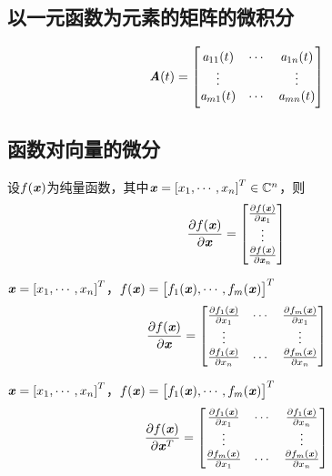 \subsection{以一元函数为元素的矩阵的微积分}
\label{sub:以一元函数为元素的矩阵的微积分}

\[
    \boldsymbol{\mathit{A}}(t) = \begin{bmatrix}
        \mathit{a}_{11}(t) & \cdots    & \mathit{a}_{1n}(t)   \\
        \vdots      &           & \vdots        \\
        \mathit{a}_{m1}(t) & \cdots    & \mathit{a}_{mn}(t)
    \end{bmatrix}
\]

\subsection{函数对向量的微分}
\label{sub:函数对向量的微分}

\begin{definition}
    设$f(\boldsymbol{\mathit{x}})$为纯量函数，其中$\boldsymbol{\mathit{x}} = \left[x_1, \cdots, x_n \right]^T \in \mathbb{C}^n$，则
    \[
        \frac{\partial f(\boldsymbol{\mathit{x}})}{\partial \boldsymbol{\mathit{x}}} = \begin{bmatrix}
            \frac{\partial f(\boldsymbol{\mathit{x}})}{\partial \boldsymbol{\mathit{x}}_1} \\
            \vdots \\
            \frac{\partial f(\boldsymbol{\mathit{x}})}{\partial \boldsymbol{\mathit{x}}_n}
        \end{bmatrix}
    \]
\end{definition}

\begin{definition}
    $\boldsymbol{\mathit{x}} = \left[x_1, \cdots, x_n \right]^T$，$f(\boldsymbol{\mathit{x}}) = \left[f_1(\boldsymbol{\mathit{x}}), \cdots, f_m(\boldsymbol{\mathit{x}}) \right]^T$
    \[
        \frac{\partial f(\boldsymbol{\mathit{x}})}{\partial \boldsymbol{\mathit{x}}} = \begin{bmatrix}
            \frac{\partial f_1(\boldsymbol{\mathit{x}})}{\partial x_1}  & \cdots & \frac{\partial f_m(\boldsymbol{\mathit{x}})}{\partial x_1} \\
            \vdots & & \vdots \\
            \frac{\partial f_1(\boldsymbol{\mathit{x}})}{\partial x_n}  & \cdots & \frac{\partial f_m(\boldsymbol{\mathit{x}})}{\partial x_n}
        \end{bmatrix}
    \]
\end{definition}

\begin{definition}[Jacobi矩阵]
    $\boldsymbol{\mathit{x}} = \left[x_1, \cdots, x_n \right]^T$，$f(\boldsymbol{\mathit{x}}) = \left[f_1(\boldsymbol{\mathit{x}}), \cdots, f_m(\boldsymbol{\mathit{x}}) \right]^T$
    \[
        \frac{\partial f(\boldsymbol{\mathit{x}})}{\partial \boldsymbol{\mathit{x}}^T} = \begin{bmatrix}
            \frac{\partial f_1(\boldsymbol{\mathit{x}})}{\partial x_1}  & \cdots & \frac{\partial f_1(\boldsymbol{\mathit{x}})}{\partial x_n} \\
            \vdots & & \vdots \\
            \frac{\partial f_m(\boldsymbol{\mathit{x}})}{\partial x_1}  & \cdots & \frac{\partial f_m(\boldsymbol{\mathit{x}})}{\partial x_n}
        \end{bmatrix}
    \]
\end{definition}


